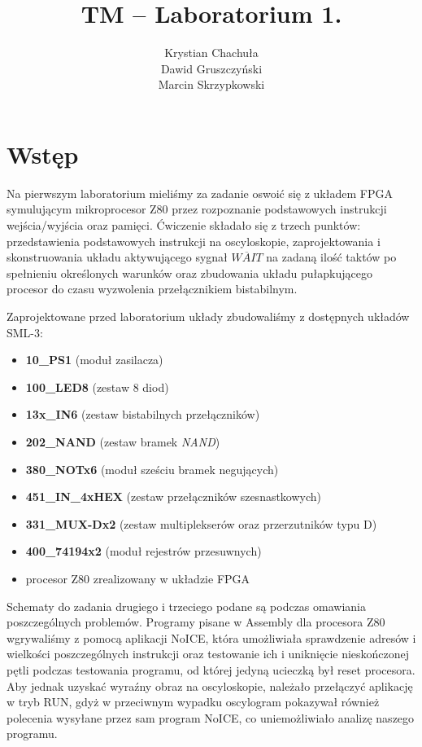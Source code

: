 \documentclass[fleqn]{article}
\title{TM -- Laboratorium 1.}
\author{Krystian Chachuła \\ Dawid Gruszczyński \\ Marcin Skrzypkowski}
\begin{document}
\maketitle

\setcounter{page}{0}
\thispagestyle{empty}

\pagebreak

\setcounter{page}{1}

\section{Wstęp}

Na pierwszym laboratorium mieliśmy za zadanie oswoić się z układem FPGA symulującym mikroprocesor Z80 przez rozpoznanie podstawowych instrukcji wejścia/wyjścia oraz pamięci. Ćwiczenie składało się z trzech punktów: przedstawienia podstawowych instrukcji na oscyloskopie, zaprojektowania i skonstruowania układu aktywującego sygnał $\overline{WAIT}$ na zadaną ilość taktów po spełnieniu określonych warunków oraz zbudowania układu pułapkującego procesor do czasu wyzwolenia przełącznikiem bistabilnym.

Zaprojektowane przed laboratorium układy zbudowaliśmy z dostępnych układów SML-3:

\begin{itemize}
	\item \textbf{10\_PS1} (moduł zasilacza)
	\item \textbf{100\_LED8} (zestaw 8 diod)
	\item \textbf{13x\_IN6} (zestaw bistabilnych przełączników)
	\item \textbf{202\_NAND} (zestaw bramek \textit{NAND})
	\item \textbf{380\_NOTx6} (moduł sześciu bramek negujących)
	\item \textbf{451\_IN\_4xHEX} (zestaw przełączników szesnastkowych)
	\item \textbf{331\_MUX-Dx2} (zestaw multiplekserów oraz przerzutników typu D)
	\item \textbf{400\_74194x2} (moduł rejestrów przesuwnych)
	\item procesor Z80 zrealizowany w układzie FPGA
\end{itemize}

Schematy do zadania drugiego i trzeciego podane są podczas omawiania poszczególnych problemów. Programy pisane w Assembly dla procesora Z80 wgrywaliśmy z pomocą aplikacji NoICE, która umożliwiała sprawdzenie adresów i wielkości poszczególnych instrukcji oraz testowanie ich i uniknięcie nieskończonej pętli podczas testowania programu, od której jedyną ucieczką był reset procesora. Aby jednak uzyskać wyraźny obraz na oscyloskopie, należało przełączyć aplikację w tryb RUN, gdyż w przeciwnym wypadku oscylogram pokazywał również polecenia wysyłane przez sam program NoICE, co uniemożliwiało analizę naszego programu.
\end{document}
